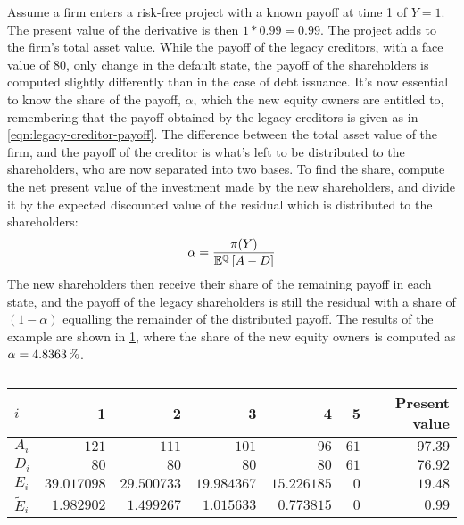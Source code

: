 \documentclass[main.tex]{subfiles}
\begin{document}
        Assume a firm enters a risk-free project with a known payoff at time 1 of $Y=\num{1}$. 
        The present value of the derivative is then $\num{1}*\num{0.99}=\num{0.99}$. 
        The project adds to the firm's total asset value. 
        While the payoff of the legacy creditors, with a face value of $\num{80}$, only change in the default state, the payoff of the shareholders is computed slightly differently than in the case of debt issuance. 
        It's now essential to know the share of the payoff, $\alpha$, which the new equity owners are entitled to, remembering that the payoff obtained by the legacy creditors is given as in \cref{eqn:legacy-creditor-payoff}. 
        The difference between the total asset value of the firm, and the payoff of the creditor is what's left to be distributed to the shareholders, who are now separated into two bases. 
        To find the share, compute the net present value of the investment made by the new shareholders, and divide it by the expected discounted value of the residual which is distributed to the shareholders:
        \begin{equation}
            \alpha = 
                \frac{
                    \pi(Y)
                }{
                    \mathbb{E}^{\mathbb{Q}}\left[A-D\right]
                }
        \end{equation}
        The new shareholders then receive their share of the remaining payoff in each state, and the payoff of the legacy shareholders is still the residual with a share of $(\num{1}-\alpha)$ equalling the remainder of the distributed payoff. 
        The results of the example are shown in \cref{tbl:equity-funding-payoff}, where the share of the new equity owners is computed as $\alpha = \pct{0.048363}$.

        \begin{table}[H]
            \centering\begin{tabular}{l|rrrrr||r}
                $i$ & 1 & 2 & 3 & 4 & 5 & Present value \\
                \hline
                $A_{i}$ & $\num{121}$ & $\num{111}$ & $\num{101}$ & $\num{96}$ & $\num{61}$ & $\num{97.39}$ \\
                $D_{i}$ & $\num{80}$ & $\num{80}$ & $\num{80}$ & $\num{80}$ & $\num{61}$ & $\num{76.92}$ \\
                $E_{i}$ & $\num{39.017098}$ & $\num{29.500733}$ & $\num{19.984367}$ & $\num{15.226185}$ & $\num{0}$ & $\num{19.48}$ \\
                $\tilde{E}_{i}$ & $\num{1.982902}$ & $\num{1.499267}$ & $\num{1.015633}$ & $\num{0.773815}$ & $\num{0}$ & $\num{0.99}$ \\
            \end{tabular}
            \caption{}
            \label{tbl:equity-funding-payoff}
        \end{table}
\end{document}

